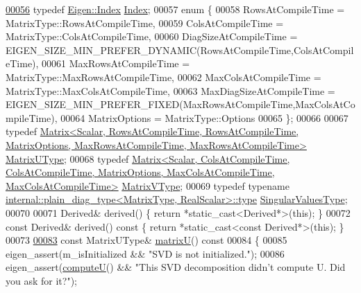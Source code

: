 \begin{DoxyCode}
\hyperlink{group___s_v_d___module_a6229a37997eca1072b52cca5ee7a2bec}{00056}   \textcolor{keyword}{typedef} \hyperlink{namespace_eigen_a62e77e0933482dafde8fe197d9a2cfde}{Eigen::Index} \hyperlink{group___s_v_d___module_a6229a37997eca1072b52cca5ee7a2bec}{Index}; 
00057   \textcolor{keyword}{enum} \{
00058     RowsAtCompileTime = MatrixType::RowsAtCompileTime,
00059     ColsAtCompileTime = MatrixType::ColsAtCompileTime,
00060     DiagSizeAtCompileTime = EIGEN\_SIZE\_MIN\_PREFER\_DYNAMIC(RowsAtCompileTime,ColsAtCompileTime),
00061     MaxRowsAtCompileTime = MatrixType::MaxRowsAtCompileTime,
00062     MaxColsAtCompileTime = MatrixType::MaxColsAtCompileTime,
00063     MaxDiagSizeAtCompileTime = EIGEN\_SIZE\_MIN\_PREFER\_FIXED(MaxRowsAtCompileTime,MaxColsAtCompileTime),
00064     MatrixOptions = MatrixType::Options
00065   \};
00066 
00067   \textcolor{keyword}{typedef} 
      \hyperlink{group___core___module}{Matrix<Scalar, RowsAtCompileTime, RowsAtCompileTime, MatrixOptions, MaxRowsAtCompileTime,
       MaxRowsAtCompileTime>}
       \hyperlink{group___core___module}{MatrixUType};
00068   \textcolor{keyword}{typedef} 
      \hyperlink{group___core___module}{Matrix<Scalar, ColsAtCompileTime, ColsAtCompileTime, MatrixOptions, MaxColsAtCompileTime,
       MaxColsAtCompileTime>}
       \hyperlink{group___core___module}{MatrixVType};
00069   \textcolor{keyword}{typedef} \textcolor{keyword}{typename} \hyperlink{class_eigen_1_1internal_1_1_tensor_lazy_evaluator_writable}{internal::plain\_diag\_type<MatrixType, RealScalar>::type}
       \hyperlink{class_eigen_1_1internal_1_1_tensor_lazy_evaluator_writable}{SingularValuesType};
00070   
00071   Derived& derived() \{ \textcolor{keywordflow}{return} *\textcolor{keyword}{static\_cast<}Derived*\textcolor{keyword}{>}(\textcolor{keyword}{this}); \}
00072   \textcolor{keyword}{const} Derived& derived()\textcolor{keyword}{ const }\{ \textcolor{keywordflow}{return} *\textcolor{keyword}{static\_cast<}\textcolor{keyword}{const }Derived*\textcolor{keyword}{>}(\textcolor{keyword}{this}); \}
00073 
\hyperlink{group___s_v_d___module_afc7fe1546b0f6e1801b86f22f5664cb8}{00083}   \textcolor{keyword}{const} MatrixUType& \hyperlink{group___s_v_d___module_afc7fe1546b0f6e1801b86f22f5664cb8}{matrixU}()\textcolor{keyword}{ const}
00084 \textcolor{keyword}{  }\{
00085     eigen\_assert(m\_isInitialized && \textcolor{stringliteral}{"SVD is not initialized."});
00086     eigen\_assert(\hyperlink{group___s_v_d___module_a705a7c2709e1624ccc19aa748a78d473}{computeU}() && \textcolor{stringliteral}{"This SVD decomposition didn't compute U. Did you ask for it?"});

\end{DoxyCode}
